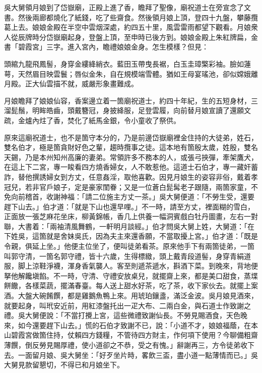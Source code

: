 吳大舅領月娘到了岱嶽廟，正殿上進了香，瞻拜了聖像，廟祝道士在旁宣念了文書。然後兩廊都燒化了紙錢，吃了些齋食。然後領月娘上頂，登四十九盤，攀藤攬葛上去。娘娘金殿在半空中雲烟深處，約四五十里，風雲雷雨都望下觀看。{}月娘衆人從辰牌時分岱嶽廟起身，登盤上頂，至申時已後方到。娘娘金殿上朱紅牌扁，金書「碧霞宮」三字。進入宮內，瞻禮娘娘金身。怎生模樣？但見：

\begin{myquote}
頭綰九龍飛鳳髻，身穿金縷絳綃衣。藍田玉帶曳長裾，白玉圭璋檠彩袖。臉如蓮萼，天然眉目映雲鬟；唇似金朱，自在規模端雪體。猶如王母宴瑤池，卻似嫦娥離月殿。正大仙雲描不就，威嚴形象畫難成。
\end{myquote}

月娘瞻拜了娘娘仙容，香案邊立着一箇廟祝道士，約四十年紀，生的五短身材，三溜髭鬚，明眸皓齒，頭戴簪冠，身披絳服，足登雲履，向前替月娘宣讀了還願文疏，金爐內炷了香，焚化了紙馬金銀，令小童收了祭供。

原來這廟祝道士，也不是箇守本分的，乃是前邊岱嶽廟裡金住持的大徒弟，姓石，雙名伯才，極是箇貪財好色之輩，趨時攬事之徒。這本地有箇殷太歲，姓殷，雙名天錫，乃是本州知州高廉的妻弟。常領許多不務本的人，或張弓挾彈，牽架鷹犬，在這上下二宮，專一睃看四方燒香婦女，{}人不敢惹他。這道士石伯才，專一藏奸蓄詐，替他撰誘婦女到方丈，任意姦淫，取他喜歡。因見月娘生的姿容非俗，戴着孝冠兒，若非官戶娘子，定是豪家閨眷；又是一位蒼白髭髯老子跟隨，兩箇家童，{}不免向前稽首，收謝神福：「請二位施主方丈一茶。」吳大舅便道：「不勞生受，還要趕下山去。」伯才道：「就是下山也還早哩。」{}不一時，請至方丈，裡面糊的雪白，正面放一張芝麻花坐床，柳黃錦帳，香几上供養一幅洞賓戲白牡丹圖畫，{}左右一對聯，大書着：「兩袖清風舞鶴，一軒明月談經。」伯才問吳大舅上姓，大舅道：「在下姓吳，這箇就是舍妹吳氏，因為夫主來還香願，不當取擾上宮。」伯才道：「既是令親，俱延上坐。」他便主位坐了，便叫徒弟看茶。原來他手下有兩箇徒弟，一箇叫郭守清，一箇名郭守禮，皆十六歲，生得標緻，頭上戴青段道髻，身穿青絹道服，脚上涼鞋淨襪，渾身香氣襲人。{}客至則遞茶遞水，斟酒下菜。到晚來，背地便拏他解饞塡餡。不一時，守清、守禮安放桌兒，就擺齋上來，都是美口甜食，蒸堞餅饊，各樣菜蔬，擺滿春臺。每人送上甜水好茶，吃了茶，收下家伙去。就擺上案酒。大盤大碗餚饌，都是雞鵝魚鴨上來。用琥珀鑲盞，滿泛金波。吳月娘見酒來，就要起身，叫玳安近前，用紅漆盤托出一疋大布、二兩白金，與石道士作致謝之禮。吳大舅便說：「不當打攪上宮，這些微禮致謝仙長。不勞見賜酒食，天色晚來，如今還要趕下山去。」慌的石伯才致謝不已，說：「小道不才，娘娘福蔭，在本山碧霞宮做箇住持，仗賴四方錢糧，不管待四方財主，作何項下使用？今聊備粗齋薄饌，倒反勞見賜厚禮，使小道卻之不恭，受之有愧。」辭謝再三，方令徒弟收下去。一面留月娘、吳大舅坐：「好歹坐片時，畧飲三盃，盡小道一點薄情而已。」吳大舅見款留懇切，不得已和月娘坐下。

